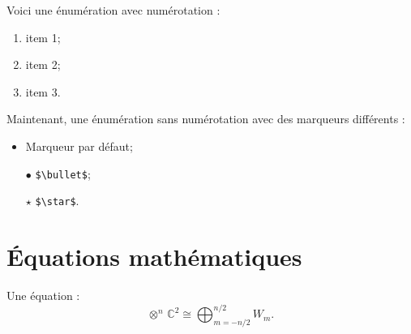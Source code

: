 \documentclass[11pt,twoside,maitrise]{dms}
\theoremstyle{definition}
\numberwithin{equation}{section}
\numberwithin{table}{chapter}
\numberwithin{figure}{chapter}
\begin{document}
Voici une énumération avec numérotation :
\begin{enumerate}
    \item item 1;
    \item item 2;
    \item item 3.
\end{enumerate}
Maintenant, une énumération sans numérotation avec des marqueurs différents :
\begin{itemize}
    \item Marqueur par défaut;
    \item[$\bullet$] \verb|$\bullet$|;
    \item[$\star$] \verb|$\star$|.
\end{itemize}

\section{Équations mathématiques}

Une équation :
\begin{equation*}
    \otimes^n\,\mathbb{C}^2 \cong \bigoplus_{m=-n/2}^{n/2} W_m.
\end{equation*}
\end{document}
